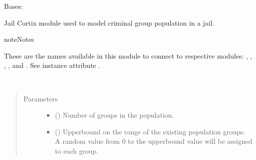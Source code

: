 \documentclass[letterpaper,10pt,openany,oneside,english]{sphinxmanual}
\begin{document}
\begin{fulllineitems}
\label{\detokenize{examples_rst/jail:jail.Jail}}
Bases: 

Jail Cortix module used to model criminal group population in a jail.

\begin{sphinxadmonition}{note}{Notes}

These are the  names available in this module to connect to respective
modules: , , , , and .
See instance attribute .
\end{sphinxadmonition}

\begin{fulllineitems}
\label{\detokenize{examples_rst/jail:jail.Jail.__init__}}~\begin{quote}\begin{description}
\item[{Parameters}] \leavevmode\begin{itemize}
\item {} 
 () \textendash{} Number of groups in the population.

\item {} 
 () \textendash{} Upperbound on the range of the existing population groups. A random value
from 0 to the upperbound value will be assigned to each group.

\end{itemize}

\end{description}\end{quote}

\end{fulllineitems}


\end{fulllineitems}
\end{document}
